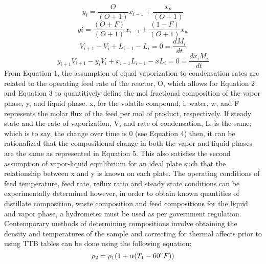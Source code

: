 \documentclass[peerreview, a4paper, 12pt]{IEEEtran}
\begin{document}
\begin{equation}
y_i = \frac{O}{({O+1})}x_{i-1} + \frac{x_p}{({O+1})}
\label{eq2}
\end{equation}   
\begin{equation}
yi = \frac{(O + F )}{(O + 1)}x_{i-1} + \frac{(1 - F)}{(O + 1)}x_w
\label{eq3}
\end{equation}
\begin{equation}
V_{i+1} - V_i + L_{{i-1}} - L_i = 0 = \frac{dM_i}{dt}
\label{eq4}
\end{equation}
\begin{equation}
    y_{i+1}V_{i+1}-y_iV_i+x_{i-1}L_{i-1}-xL_i = 0 = \frac{dx_iM_i}{dt}
    \label{eq5}
\end{equation}
From Equation 1, the assumption of equal vaporization to condensation rates are related to the operating feed rate of the reactor, O, which allows for Equation 2 and Equation 3 to quantitively define the mol fractional composition of the vapor phase, y, and liquid phase. x, for the volatile compound, i, water, w, and F represents the molar flux of the feed per mol of product, respectively. If steady state and the rate of vaporization, V, and rate of condensation, L, is the same; which is to say, the change over time is 0 (see Equation 4) then, it can be rationalized that the compositional change in both the vapor and liquid phases are the same as represented in Equation 5. This also satisfies the second assumption of vapor-liquid equilibrium for an ideal plate such that the relationship between x and y is known on each plate. The operating conditions of feed temperature, feed rate, reflux ratio and steady state conditions can be experimentally determined however, in order to obtain known quantities of distillate composition, waste composition and feed compositions for the liquid and vapor phase, a hydrometer must be used as per government regulation. Contemporary methods of determining compositions involve obtaining the density and temperatures of the sample and correcting for thermal affects prior to using TTB tables can be done using the following equation: 
\begin{equation}
    \rho_2 = \rho_1 (1 + \alpha (T_1 - 60\degree F))
    \label{eq6}
\end{equation}
\end{document}
